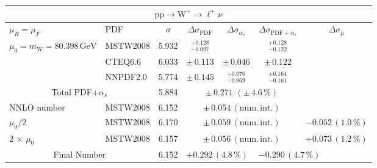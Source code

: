 \begin{table}[htb]
  \begin{center}
    \begin{tabular}{|l|l|c|c|c|c|c|}
      \hline
      
      \multicolumn{7}{|c|}{$\mathrm{pp}\to\mathrm{W}^+\to{\ell^+\nu}$} \\ \hline
      $\mu_R=\mu_F$ & PDF & $\sigma$ & $\Delta\sigma_{\mathrm{PDF}}$ & $\Delta\sigma_{\alpha_s}$ & $\Delta\sigma_{\mathrm{PDF}+\alpha_s}$ & $\Delta\sigma_{\mu}$ \\ \hline\hline
      $\mu_0=m_\mathrm{W}=80.398\,\mathrm{GeV}$  & MSTW2008 & 5.932 & $^{+0.128}_{-0.097}$ &     &  $^{+0.128}_{-0.122}$    &     \\
                                                & CTEQ6.6  & 6.033 & $\pm\,0.113$ &  $\pm\,0.046$  &  $\pm\,0.122$       &     \\
                                                & NNPDF2.0 & 5.774 & $\pm\,0.145$ &  $^{+0.076}_{-0.069}$  & $^{+0.164}_{-0.161}$     &     \\ \hline\hline
      \multicolumn{2}{|c|}{Total PDF+$\alpha_s$}      &  5.884 & \multicolumn{3}{c|}{$\pm\,0.271\,\,(\pm\,4.6\,\%)$} & \\ \hline\hline
      NNLO number                               & MSTW2008 & 6.152 & \multicolumn{3}{c|}{$\pm\,0.054\,(\mathrm{num.\,int.})$} & \\
      $\mu_0/2$                                 & MSTW2008 & 6.170 & \multicolumn{3}{c|}{$\pm\,0.059\,(\mathrm{num.\,int.})$} & $-0.052\,(1.0\,\%)$\\ 
      $2\,\times\,\mu_0$                        & MSTW2008 & 6.157 & \multicolumn{3}{c|}{$\pm\,0.056\,(\mathrm{num.\,int.})$} & $+0.073\,(1.2\,\%)$\\ \hline\hline
      \multicolumn{2}{|c|}{Final Number} & 6.152 & \multicolumn{2}{l}{$+0.292\,(4.8\,\%)$} & \multicolumn{2}{l|}{$-0.290\,(4.7\,\%)$} \\


\hline 
\end{tabular}
\end{center}
\end{table} 


